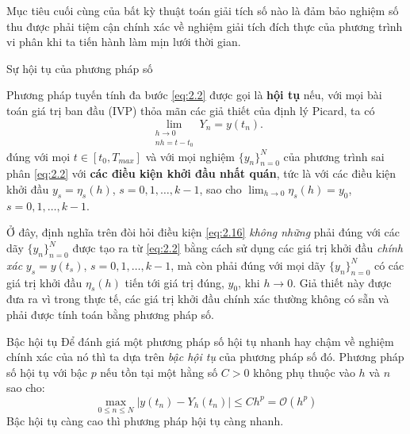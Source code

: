 Mục tiêu cuối cùng của bất kỳ thuật toán giải tích số nào là đảm bảo nghiệm số thu được phải tiệm cận chính xác về nghiệm giải tích đích thực của phương trình vi phân khi ta tiến hành làm mịn lưới thời gian.

\vspace{0.5em}

\begin{baitapbox}{Sự hội tụ của phương pháp số}
    
    Phương pháp tuyến tính đa bước \eqref{eq:2.2} được gọi là \textbf{hội tụ} nếu, với mọi bài toán giá trị ban đầu (IVP) thỏa mãn các giả thiết của định lý Picard, ta có
    \begin{equation}
        \lim_{\substack{h \to 0 \\ n h = t - t_0}} Y_n = y(t_n). \tag{2.16} \label{eq:2.16}
    \end{equation}
    đúng với mọi $t \in [t_0, T_{max}]$ và với mọi nghiệm $\{y_n\}_{n=0}^N$ của phương trình sai phân \eqref{eq:2.2} với \textbf{các điều kiện khởi đầu nhất quán}, tức là với các điều kiện khởi đầu $y_s = \eta_s(h)$, $s = 0, 1, \dots, k - 1$, sao cho $\displaystyle\lim_{h \to 0} \eta_s(h) = y_0$, $s = 0, 1, \dots, k - 1$.\\
    
\end{baitapbox}

Ở đây, định nghĩa trên đòi hỏi điều kiện \eqref{eq:2.16} \textit{không những} phải đúng với các dãy $\{y_n\}_{n=0}^N$ được tạo ra từ \eqref{eq:2.2} bằng cách sử dụng các giá trị khởi đầu \textit{chính xác} $y_s = y(t_s)$, $s = 0, 1, \dots, k - 1$, mà còn phải đúng với mọi dãy $\{y_n\}_{n=0}^N$ có các giá trị khởi đầu $\eta_s(h)$ tiến tới giá trị đúng, $y_0$, khi $h \to 0$. Giả thiết này được đưa ra vì trong thực tế, các giá trị khởi đầu chính xác thường không có sẵn và phải được tính toán bằng phương pháp số.

\vspace{0.5em}

\begin{baitapbox}{Bậc hội tụ}
    Để đánh giá một phương pháp số hội tụ nhanh hay chậm về nghiệm chính xác của nó thì ta dựa trên \textit{bậc hội tụ} của phương pháp số đó. Phương pháp số hội tụ với bậc \textit{$p$} nếu tồn tại một hằng số $C > 0$ không phụ thuộc vào $h$ và $n$ sao cho:
   \[
    \max_{0 \le n\le N}|y(t_n) - Y_h(t_n)| \le Ch^p = \mathcal{O}(h^p)
   \]
   Bậc hội tụ càng cao thì phương pháp hội tụ càng nhanh.
\end{baitapbox}

